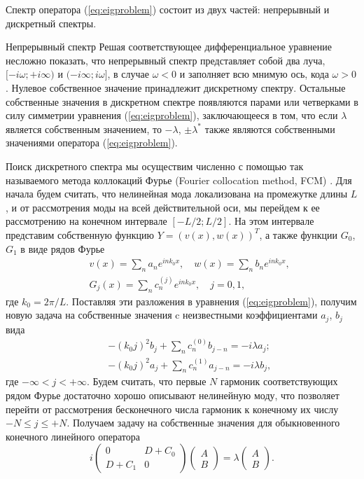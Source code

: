 Спектр оператора (\ref{eq:eigproblem}) состоит из двух частей: непрерывный и дискретный спектры.

Непрерывный спектр 
Решая соответствующее дифференциальное уравнение несложно показать, что непрерывный спектр представляет собой два луча, $[-i \omega; +i \infty)$ и $( -i \infty; i \omega]$, в случае $\omega < 0$ и заполняет всю мнимую ось, кода $\omega > 0$.
Нулевое собственное значение принадлежит дискретному спектру.
Остальные собственные значения в дискретном спектре появляются парами или четверками в силу симметрии уравнения (\ref{eq:eigproblem}), заключающееся в том, что если $\lambda$ является собственным значением, то $-\lambda$, $\pm \lambda^*$ также являются собственными значениями оператора (\ref{eq:eigproblem}).

Поиск дискретного спектра мы осуществим численно с помощью так называемого метода коллокаций Фурье (Fourier collocation method, FCM) \cite{JYang}.
Для начала будем считать, что нелинейная мода локализована на промежутке длины $L$, и от рассмотрения моды на всей действительной оси, мы перейдем к ее рассмотрению на конечном интервале $[-L/2; L/2]$.
На этом интервале представим собственную функцию $Y = (v(x), w(x))^T$, а также функции $G_0$, $G_1$ в виде рядов Фурье
%
\begin{eqnarray}
&& v(x) = \sum \limits_n a_n e^{i n k_0 x}, \quad w(x) = \sum \limits_n b_n e^{i n k_0 x}, \\
&& G_j(x) = \sum \limits_n c_n^{(j)} e^{i n k_0 x}, \quad j = 0, 1,
\end{eqnarray}
%
где $k_0 = 2 \pi / L$.
Поставляя эти разложения в уравнения (\ref{eq:eigproblem}), получим новую задача на собственные значения c неизвестными коэффициентами $a_j$, $b_j$ вида
%
\begin{eqnarray}
&& -(k_0 j)^2 b_j + \sum \limits_n c_n^{(0)} b_{j-n} = -i \lambda a_j; \\
&& -(k_0 j)^2 a_j + \sum \limits_n c_n^{(1)} a_{j-n} = -i \lambda b_j,
\end{eqnarray}
%
где $-\infty < j < +\infty$.
Будем считать, что первые $N$ гармоник соответствующих рядом Фурье достаточно хорошо описывают нелинейную моду, что позволяет перейти от рассмотрения бесконечного числа гармоник к конечному их числу $-N \le j \le +N$.
Получаем задачу на собственные значения для обыкновенного конечного линейного оператора
%
\begin{equation}
i \begin{pmatrix}
0 & D + C_0 \\
D + C_1 & 0
\end{pmatrix}
\begin{pmatrix}
A \\ B
\end{pmatrix}
= \lambda
\begin{pmatrix}
A \\ B
\end{pmatrix}.
\label{eq:eigproblem_alg}
\end{equation}
